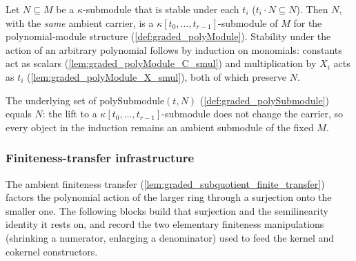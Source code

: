 \begin{definition}
  \label{def:graded_polySubmodule}
  Let \(N \subseteq M\) be a \(\kappa\)-submodule that is stable under each \(t_i\)
  (\(t_i \cdot N \subseteq N\)). Then \(N\), with the \emph{same} ambient carrier, is a
  \(\kappa[t_0, \dots, t_{r-1}]\)-submodule of \(M\) for the polynomial-module structure
  (\cref{def:graded_polyModule}). Stability under the action of an arbitrary polynomial
  follows by induction on monomials: constants act as scalars
  (\cref{lem:graded_polyModule_C_smul}) and multiplication by \(X_i\) acts as \(t_i\)
  (\cref{lem:graded_polyModule_X_smul}), both of which preserve \(N\).
\end{definition}

\begin{lemma}
  \label{lem:graded_polySubmodule_coe}
  The underlying set of \(\mathrm{polySubmodule}(t, N)\)
  (\cref{def:graded_polySubmodule}) equals \(N\): the lift to a
  \(\kappa[t_0, \dots, t_{r-1}]\)-submodule does not change the carrier, so every object
  in the induction remains an ambient submodule of the fixed \(M\).
\end{lemma}

\subsubsection*{Finiteness-transfer infrastructure}

The ambient finiteness transfer (\cref{lem:graded_subquotient_finite_transfer})
factors the polynomial action of the larger ring through a surjection onto the
smaller one. The following blocks build that surjection and the semilinearity
identity it rests on, and record the two elementary finiteness manipulations
(shrinking a numerator, enlarging a denominator) used to feed the kernel and
cokernel constructors.

